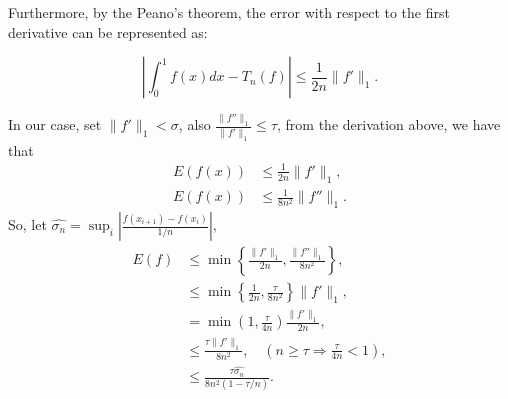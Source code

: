 \documentclass[12pt]{article}
\begin{document}
Furthermore, by the Peano's theorem, the error with respect to the first derivative can be represented as:

$$\left|\int_{0}^{1}f(x)dx-T_n(f)\right|\leq\frac{1}{2n}\|f'\|_{1}.$$
%
%

In our case, set $\|f'\|_{1}<\sigma$, also $\frac{\|f''\|_{1}}{\|f'\|_{1}}\leq\tau$, from the derivation above, we have that
\begin{align*}
  E(f(x)) &\leq \frac{1}{2n}\|f'\|_{1},\\
  E(f(x)) &\leq \frac{1}{8n^2}\|f''\|_{1}.
\end{align*}
So, let $\hat{\sigma_n}=\sup_i\left|\frac{f(x_{i+1})-f(x_i)}{1/n}\right|$,
\begin{align*}
  E(f) &\leq \min\left\{\frac{\|f'\|_{1}}{2n},\frac{\|f''\|_{1}}{8n^2}\right\},\\
  &\leq \min\left\{\frac{1}{2n},\frac{\tau}{8n^2}\right\}\|f'\|_{1},\\
  &= \min(1,\frac{\tau}{4n})\frac{\|f'\|_{1}}{2n},\\
  &\leq \frac{\tau\|f'\|_{1}}{8n^2}, \quad (n\geq \tau \Rightarrow \frac{\tau}{4n}<1),\\
  &\leq \frac{\tau\hat{\sigma_n}}{8n^2(1-\tau/n)}.
\end{align*}
\end{document}
